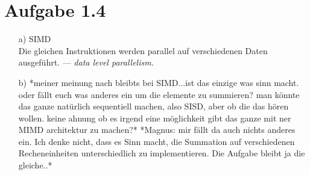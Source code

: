 \documentclass[a4paper,
               12pt,
               titlepage,
               BCOR12mm,
               ]{scrartcl}
\begin{document}
  \section*{Aufgabe 1.4}

    \begin{itemize}
      \item [a)] SIMD \\ Die gleichen Instruktionen werden parallel auf verschiedenen
				Daten ausgeführt. --- \emph{data level parallelism.}
      \item [b)] *meiner meinung nach bleibts bei SIMD...ist das einzige was sinn macht. oder fällt euch was anderes ein um die elemente zu summieren? man könnte das ganze natürlich sequentiell machen, also SISD, aber ob die das hören wollen. keine ahnung ob es irgend eine möglichkeit gibt das ganze mit ner MIMD architektur zu machen?*
				*Magnus: mir fällt da auch nichts anderes ein. Ich denke nicht, dass es Sinn
				macht, die Summation auf verschiedenen Recheneinheiten unterschiedlich zu
				implementieren. Die Aufgabe bleibt ja die gleiche..*
    \end{itemize}

		\nocite{*}
		
		
\end{document}
